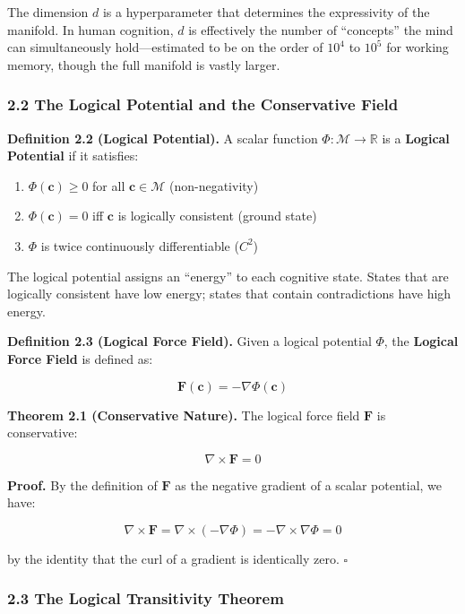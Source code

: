\documentclass[
  11pt,
  a4paper,
]{article}
\providecommand{\tightlist}{%
  \setlength{\itemsep}{0pt}\setlength{\parskip}{0pt}}
\begin{document}
The dimension \(d\) is a hyperparameter that determines the expressivity
of the manifold. In human cognition, \(d\) is effectively the number of
``concepts'' the mind can simultaneously hold---estimated to be on the
order of \(10^4\) to \(10^5\) for working memory, though the full
manifold is vastly larger.

\subsubsection{2.2 The Logical Potential and the Conservative
Field}\label{the-logical-potential-and-the-conservative-field}

\textbf{Definition 2.2 (Logical Potential).} A scalar function
\(\Phi: \mathcal{M} \to \mathbb{R}\) is a \textbf{Logical Potential} if
it satisfies:

\begin{enumerate}
\def\labelenumi{\arabic{enumi}.}
\tightlist
\item
  \(\Phi(\mathbf{c}) \geq 0\) for all \(\mathbf{c} \in \mathcal{M}\)
  (non-negativity)
\item
  \(\Phi(\mathbf{c}) = 0\) iff \(\mathbf{c}\) is logically consistent
  (ground state)
\item
  \(\Phi\) is twice continuously differentiable (\(C^2\))
\end{enumerate}

The logical potential assigns an ``energy'' to each cognitive state.
States that are logically consistent have low energy; states that
contain contradictions have high energy.

\textbf{Definition 2.3 (Logical Force Field).} Given a logical potential
\(\Phi\), the \textbf{Logical Force Field} is defined as:

\[\mathbf{F}(\mathbf{c}) = -\nabla \Phi(\mathbf{c})\]

\textbf{Theorem 2.1 (Conservative Nature).} The logical force field
\(\mathbf{F}\) is conservative:

\[\nabla \times \mathbf{F} = 0\]

\textbf{Proof.} By the definition of \(\mathbf{F}\) as the negative
gradient of a scalar potential, we have:

\[\nabla \times \mathbf{F} = \nabla \times (-\nabla \Phi) = -\nabla \times \nabla \Phi = 0\]

by the identity that the curl of a gradient is identically zero.
\(\square\)

\subsubsection{2.3 The Logical Transitivity
Theorem}\label{the-logical-transitivity-theorem}
\end{document}
